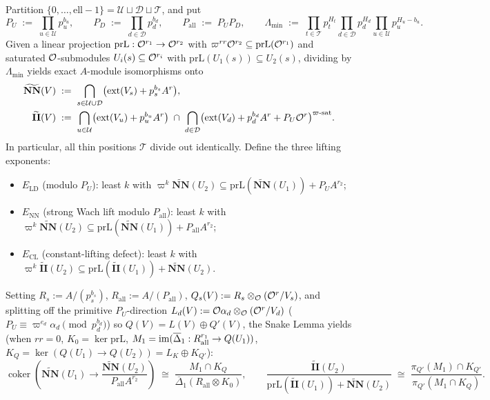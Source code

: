 \begin{lemma}
\label{lem:18:wach-snake}
Partition $\{0, \dots, \mathrm{ell} - 1\} = \mathcal{U} \sqcup \mathcal{D} \sqcup \mathcal{T}$, and put
\[
  P_U \;:=\; \prod_{u \in \mathcal{U}} p_u^{b_u}, \qquad
  P_D \;:=\; \prod_{d \in \mathcal{D}} p_d^{b_d}, \qquad
  P_{\mathrm{all}} \;:=\; P_U P_D, \qquad
  \Lambda_{\min} \;:=\; \prod_{t \in \mathcal{T}} p_t^{H_t}\prod_{d \in \mathcal{D}} p_d^{H_d}\prod_{u \in \mathcal{U}} p_u^{H_u - b_u}.
\]
Given a linear projection $\mathrm{prL} : \mathcal{O}^{r_1} \to \mathcal{O}^{r_2}$ with $\varpi^{rr}\mathcal{O}^{r_2} \subseteq \mathrm{prL}(\mathcal{O}^{r_1})$ and saturated $\mathcal{O}$-submodules $U_i(s) \subseteq \mathcal{O}^{r_i}$ with $\mathrm{prL}(U_1(s)) \subseteq U_2(s)$, dividing by $\Lambda_{\min}$ yields exact $A$-module isomorphisms onto
\begin{align*}
  \widetilde{\mathbf{NN}}(V) &\;:=\; \bigcap_{s \in \mathcal{U} \cup \mathcal{D}} \bigl(\mathrm{ext}(V_s) + p_s^{b_s} A^r\bigr), \\
  \widetilde{\mathbf{II}}(V) &\;:=\; \bigcap_{u \in \mathcal{U}} \bigl(\mathrm{ext}(V_u) + p_u^{b_u} A^r\bigr)
  \;\cap\; \bigcap_{d \in \mathcal{D}} \bigl(\mathrm{ext}(V_d) + p_d^{b_d} A^r + P_U \mathcal{O}^r\bigr)^{\varpi\text{-sat}}.
\end{align*}
In particular, all thin positions $\mathcal{T}$ divide out identically. Define the three lifting exponents:
\begin{itemize}
\item $E_{\mathrm{LD}}$ (modulo $P_U$): least $k$ with $\varpi^k \widetilde{\mathbf{NN}}(U_2) \subseteq \mathrm{prL}(\widetilde{\mathbf{NN}}(U_1)) + P_U A^{r_2}$;
\item $E_{\mathrm{NN}}$ (strong Wach lift modulo $P_{\mathrm{all}}$): least $k$ with $\varpi^k \widetilde{\mathbf{NN}}(U_2) \subseteq \mathrm{prL}(\widetilde{\mathbf{NN}}(U_1)) + P_{\mathrm{all}} A^{r_2}$;
\item $E_{\mathrm{CL}}$ (constant-lifting defect): least $k$ with $\varpi^k \widetilde{\mathbf{II}}(U_2) \subseteq \mathrm{prL}(\widetilde{\mathbf{II}}(U_1)) + \widetilde{\mathbf{NN}}(U_2)$.
\end{itemize}
Setting $R_s := A / (p_s^{b_s})$, $R_{\mathrm{all}} := A / (P_{\mathrm{all}})$, $Q_s(V) := R_s \otimes_{\mathcal{O}} (\mathcal{O}^r / V_s)$, and splitting off the primitive $P_U$-direction $L_d(V) := \mathcal{O}\alpha_d \otimes_{\mathcal{O}} (\mathcal{O}^r / V_d)$ ($P_U \equiv \varpi^{e_d}\alpha_d \pmod{p_d^{b_d}}$) so $Q(V) = L(V) \oplus Q'(V)$, the Snake Lemma yields (when $rr = 0$, $K_0 = \ker\mathrm{prL}$, $M_1 = \operatorname{im}(\overline{\Delta}_1 : R_{\mathrm{all}}^{r_1} \to Q(U_1))$, $K_Q = \ker(Q(U_1) \to Q(U_2)) = L_K \oplus K_{Q'}$):
\begin{equation}
\label{eq:18:snake-iso}
  \operatorname{coker}\!\left(\widetilde{\mathbf{NN}}(U_1) \to \frac{\widetilde{\mathbf{NN}}(U_2)}{P_{\mathrm{all}} A^{r_2}}\right)
  \;\cong\; \frac{M_1 \cap K_Q}{\overline{\Delta}_1(R_{\mathrm{all}} \otimes K_0)},
  \qquad
  \frac{\widetilde{\mathbf{II}}(U_2)}{\mathrm{prL}(\widetilde{\mathbf{II}}(U_1)) + \widetilde{\mathbf{NN}}(U_2)}
  \;\cong\; \frac{\pi_{Q'}(M_1) \cap K_{Q'}}{\pi_{Q'}(M_1 \cap K_Q)}.
\end{equation}
\end{lemma}

